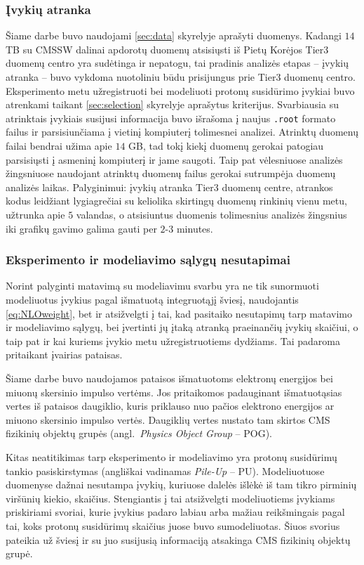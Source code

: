 \documentclass[a4paper, 12pt]{article}
\newcommand{\ttt}[1]{\texttt{#1}}
\newlength\q
\begin{document}
\subsubsection{Įvykių atranka}

Šiame darbe buvo naudojami \ref{sec:data} skyrelyje aprašyti duomenys.
Kadangi $14$ TB su CMSSW dalinai apdorotų duomenų atsisiųsti iš Pietų Korėjos Tier3 duomenų centro yra sudėtinga ir nepatogu,
tai pradinis analizės etapas -- įvykių atranka -- buvo vykdoma nuotoliniu būdu prisijungus prie Tier3 duomenų centro.
Eksperimento metu užregistruoti bei modeliuoti protonų susidūrimo įvykiai buvo atrenkami taikant \ref{sec:selection}
skyrelyje aprašytus kriterijus.
Svarbiausia su atrinktais įvykiais susijusi informacija buvo išrašoma į naujus \ttt{.root} formato failus ir parsisiunčiama
į vietinį kompiuterį tolimesnei analizei.
Atrinktų duomenų failai bendrai užima apie $14$ GB, tad tokį kiekį duomenų gerokai patogiau parsisiųsti į asmeninį kompiuterį
ir jame saugoti.
Taip pat vėlesniuose analizės žingsniuose naudojant atrinktų duomenų failus gerokai sutrumpėja duomenų analizės laikas.
Palyginimui: įvykių atranka Tier3 duomenų centre, atrankos kodus leidžiant lygiagrečiai su keliolika skirtingų duomenų rinkinių
vienu metu, užtrunka apie $5$ valandas, o atsisiuntus duomenis tolimesnius analizės žingsnius iki grafikų gavimo galima gauti
per $2$-$3$ minutes.

\subsubsection{Eksperimento ir modeliavimo sąlygų nesutapimai}\label{sec:SFs}

Norint palyginti matavimą su modeliavimu svarbu yra ne tik sunormuoti modeliuotus įvykius pagal išmatuotą integruotąjį šviesį,
naudojantis \eqref{eq:NLOweight}, bet ir atsižvelgti į tai, kad pasitaiko nesutapimų tarp matavimo ir modeliavimo sąlygų,
bei įvertinti jų įtaką atranką praeinančių įvykių skaičiui, o taip pat ir kai kuriems įvykio metu užregistruotiems dydžiams.
Tai padaroma pritaikant įvairias pataisas.

Šiame darbe buvo naudojamos pataisos išmatuotoms elektronų energijos bei miuonų skersinio impulso vertėms.
Jos pritaikomos padauginant išmatuotąsias vertes iš pataisos daugiklio, kuris priklauso nuo pačios elektrono energijos ar miuono
skersinio impulso vertės.
Daugiklių vertes nustato tam skirtos CMS fizikinių objektų grupės (angl.\ \textit{Physics Object Group} -- POG).

Kitas neatitikimas tarp eksperimento ir modeliavimo yra protonų susidūrimų tankio pasiskirstymas (angliškai vadinamas
\textit{Pile-Up} -- PU).
Modeliuotuose duomenyse dažnai nesutampa įvykių, kuriuose dalelės išlėkė iš tam tikro pirminių viršūnių kiekio, skaičius.
Stengiantis į tai atsižvelgti modeliuotiems įvykiams priskiriami svoriai, kurie įvykius padaro labiau arba mažiau reikšmingais
pagal tai, koks protonų susidūrimų skaičius juose buvo sumodeliuotas.
Šiuos svorius pateikia už šviesį ir su juo susijusią informaciją atsakinga CMS fizikinių objektų grupė.
\end{document}
